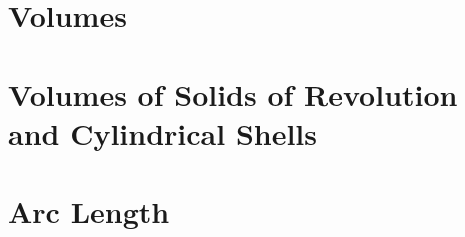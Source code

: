 \section{Volumes}



\section{Volumes of Solids of Revolution and Cylindrical Shells}


\section{Arc Length}


